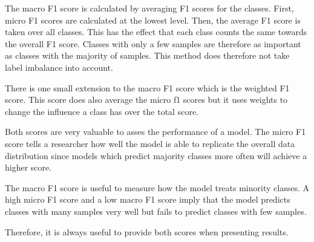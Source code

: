 The macro F1 score is calculated by averaging F1 scores for the classes. First, micro F1 scores are calculated at the lowest level. Then, the average F1 score is taken over all classes. This has the effect that each class counts the same towards the overall F1 score. Classes with only a few samples are therefore as important as classes with the majority of samples. This method does therefore not take label imbalance into account.
\medskip

There is one small extension to the macro F1 score which is the weighted F1 score. This score does also average the micro f1 scores but it uses weights to change the influence a class has over the total score.
\bigskip

Both scores are very valuable to asses the performance of a model. The micro F1 score tells a researcher how well the model is able to replicate the overall data distribution since models which predict majority classes more often will achieve a higher score. 
\medskip

The macro F1 score is useful to measure how the model treats minority classes. A high micro F1 score and a low macro F1 score imply that the model predicts classes with many samples very well but fails to predict classes with few samples.

Therefore, it is always useful to provide both scores when presenting results.